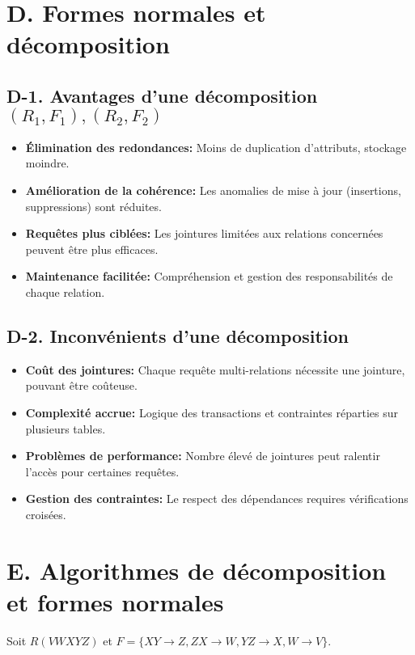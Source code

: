 \documentclass[a4paper,11pt]{article}
\begin{document}
\newpage
\section*{D. Formes normales et d\'ecomposition}

\subsection*{D-1. Avantages d'une décomposition $(R_1,F_1),(R_2,F_2)$}
\begin{itemize}
  \item\textbf{Élimination des redondances:} Moins de duplication d'attributs, stockage moindre.
  \item\textbf{Amélioration de la cohérence:} Les anomalies de mise \`a jour (insertions, suppressions) sont réduites.
  \item\textbf{Requêtes plus ciblées:} Les jointures limitées aux relations concernées peuvent \^etre plus efficaces.
  \item\textbf{Maintenance facilitée:} Compréhension et gestion des responsabilités de chaque relation.
\end{itemize}

\subsection*{D-2. Inconvénients d'une d\'ecomposition}
\begin{itemize}
  \item\textbf{Coût des jointures:} Chaque requête multi-relations nécessite une jointure, pouvant \^etre coûteuse.
  \item\textbf{Complexité accrue:} Logique des transactions et contraintes réparties sur plusieurs tables.
  \item\textbf{Problèmes de performance:} Nombre élevé de jointures peut ralentir l'accès pour certaines requêtes.
  \item\textbf{Gestion des contraintes:} Le respect des dépendances requires vérifications croisées.
\end{itemize}

\newpage
\section*{E. Algorithmes de décomposition et formes normales}
Soit $R(VWXYZ)$ et $F=\{XY\to Z, ZX\to W, YZ\to X, W\to V\}$.
\end{document}
